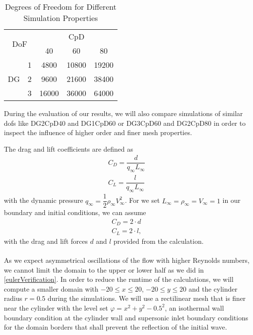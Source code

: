 	\begin{table}[htp]
		\centering
		\def\arraystretch{1.5}
			\begin{tabular}{|c|c|c|c|c|}
				\hline
				\multicolumn{2}{|c|}{\multirow{2}{*}{DoF}} & \multicolumn{3}{c|}{CpD} \\ \cline{3-5} 
				\multicolumn{2}{|c|}{}                       & 40     & 60    & 80    \\ \hline
				\multirow{3}{*}{DG}            & 1           &    4800    &    10800   &    19200    \\ \cline{2-5} 
				& 2           &    9600    &   21600    &    38400    \\ \cline{2-5} 
				& 3           &      16000  &   36000    &   64000     \\ \hline
			\end{tabular}
			\caption{Degrees of Freedom for Different Simulation Properties}	
			\label{DOF}
	\end{table}
	During the evaluation of our results, we will also compare simulations of similar \gls{dof}s like DG2CpD40 and DG1CpD60 or DG3CpD60 and DG2CpD80 in order to inspect the influence of higher order and finer mesh properties.
	
	 The drag and lift coefficients are defined as
	\begin{align}
		C_D = \dfrac{d}{q_\infty L_\infty} \\
		C_L = \dfrac{l}{q_\infty L_\infty}
	\end{align}
	with the dynamic pressure $q_\infty = \dfrac{1}{2} \rho_\infty V_\infty^2$. For we set $L_\infty = \rho_\infty = V_\infty = 1$ in our boundary and initial conditions, we can assume
	\begin{align}
		C_D = 2 \cdot d \\
		C_L = 2 \cdot l,
	\end{align}
	with the drag and lift forces $d$ and $l$ provided from the calculation. \\\\
	As we expect asymmetrical oscillations of the flow with higher Reynolds numbers, we cannot limit the domain to the upper or lower half as we did in \cref{eulerVerification}. In order to reduce the runtime of the calculations, we will compute a smaller domain with $-20 \leq x \leq 20$, $-20 \leq y \leq 20$ and the cylinder radius $r = 0.5$ during the simulations.
	We will use a rectilinear mesh that is finer near the cylinder with the level set $\varphi = x^2 + y^2 -0.5^2$, an isothermal wall boundary condition at the cylinder wall and supersonic inlet boundary conditions for the domain borders that shall prevent the reflection of the initial wave.  \\\\
		
